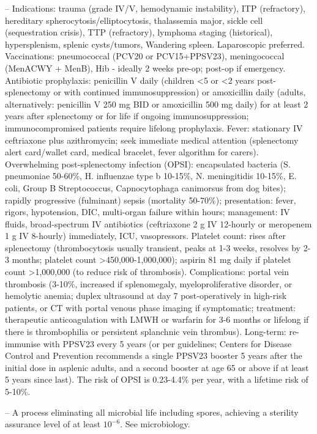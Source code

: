 -- Indications: trauma (grade IV/V, hemodynamic instability), ITP (refractory), hereditary spherocytosis/elliptocytosis, thalassemia major, sickle cell (sequestration crisis), TTP (refractory), lymphoma staging (historical), hypersplenism, splenic cysts/tumors, Wandering spleen. Laparoscopic preferred. Vaccinations: pneumococcal (PCV20 or PCV15+PPSV23), meningococcal (MenACWY + MenB), Hib - ideally 2 weeks pre-op; post-op if emergency. Antibiotic prophylaxis: penicillin V daily (children <5 or <2 years post-splenectomy or with continued immunosuppression) or amoxicillin daily (adults, alternatively: penicillin V 250 mg BID or amoxicillin 500 mg daily) for at least 2 years after splenectomy or for life if ongoing immunosuppression; immunocompromised patients require lifelong prophylaxis. Fever: stationary IV ceftriaxone plus azithromycin; seek immediate medical attention (splenectomy alert card/wallet card, medical bracelet, fever algorithm for carers). Overwhelming post-splenectomy infection (OPSI): encapsulated bacteria (S. pneumoniae 50-60\%, H. influenzae type b 10-15\%, N. meningitidis 10-15\%, E. coli, Group B Streptococcus, Capnocytophaga canimorsus from dog bites); rapidly progressive (fulminant) sepsis (mortality 50-70\%); presentation: fever, rigors, hypotension, DIC, multi-organ failure within hours; management: IV fluids, broad-spectrum IV antibiotics (ceftriaxone 2 g IV 12-hourly or meropenem 1 g IV 8-hourly) immediately, ICU, vasopressors. Platelet count: rises after splenectomy (thrombocytosis usually transient, peaks at 1-3 weeks, resolves by 2-3 months; platelet count >450,000-1,000,000); aspirin 81 mg daily if platelet count >1,000,000 (to reduce risk of thrombosis). Complications: portal vein thrombosis (3-10\%, increased if splenomegaly, myeloproliferative disorder, or hemolytic anemia; duplex ultrasound at day 7 post-operatively in high-risk patients, or CT with portal venous phase imaging if symptomatic; treatment: therapeutic anticoagulation with LMWH or warfarin for 3-6 months or lifelong if there is thrombophilia or persistent splanchnic vein thrombus). Long-term: re-immunise with PPSV23 every 5 years (or per guidelines; Centers for Disease Control and Prevention recommends a single PPSV23 booster 5 years after the initial dose in asplenic adults, and a second booster at age 65 or above if at least 5 years since last). The risk of OPSI is 0.23-4.4\% per year, with a lifetime risk of 5-10\%.

-- A process eliminating all microbial life including spores, achieving a sterility assurance level of at least $10^{-6}$. See microbiology.

